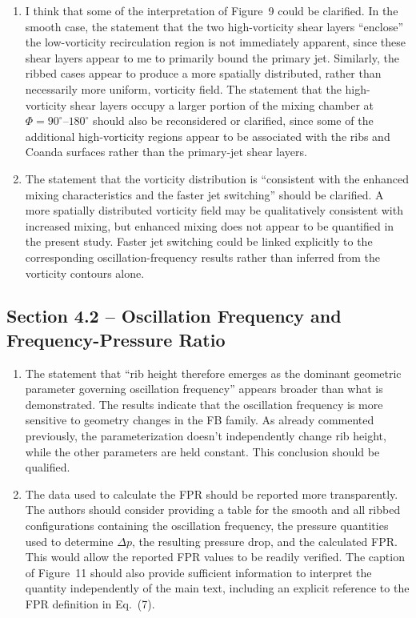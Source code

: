\documentclass[11pt]{article}
\begin{document}
\begin{enumerate}
		\item I think that some of the interpretation of Figure~9 could be clarified. In the smooth case, the statement that the two high-vorticity shear layers ``enclose'' the low-vorticity recirculation region is not immediately apparent, since these shear layers appear to me to primarily bound the primary jet. Similarly, the ribbed cases appear to produce a more spatially distributed, rather than necessarily more uniform, vorticity field. The statement that the high-vorticity shear layers occupy a larger portion of the mixing chamber at $\Phi=90^\circ$--$180^\circ$ should also be reconsidered or clarified, since some of the additional high-vorticity regions appear to be associated with the ribs and Coanda surfaces rather than the primary-jet shear layers.
		
		\item The statement that the vorticity distribution is ``consistent with the enhanced mixing characteristics and the faster jet switching'' should be clarified. A more spatially distributed vorticity field may be qualitatively consistent with increased mixing, but enhanced mixing does not appear to be quantified in the present study. Faster jet switching could be linked explicitly to the corresponding oscillation-frequency results rather than inferred from the vorticity contours alone.
	\end{enumerate}
	
	\subsection*{Section 4.2 -- Oscillation Frequency and Frequency-Pressure Ratio}
	
	\begin{enumerate}
		\item The statement that ``rib height therefore emerges as the dominant geometric parameter governing oscillation frequency'' appears broader than what is demonstrated. The results indicate that the oscillation frequency is more sensitive to geometry changes in the FB family. As already commented previously, the parameterization doesn't independently change rib height, while the other parameters are held constant. This conclusion should be qualified.
		
		\item The data used to calculate the FPR should be reported more transparently. The authors should consider providing a table for the smooth and all ribbed configurations containing the oscillation frequency, the pressure quantities used to determine $\Delta p$, the resulting pressure drop, and the calculated FPR. This would allow the reported FPR values to be readily verified. The caption of Figure~11 should also provide sufficient information to interpret the quantity independently of the main text, including an explicit reference to the FPR definition in Eq.~(7).
	\end{enumerate}
	
\end{document}
